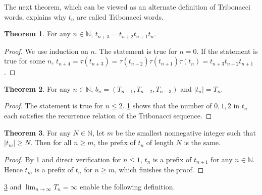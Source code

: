 \documentclass{article}
\theoremstyle{definition}
\newtheorem{theorem}{Theorem}
\begin{document}
The next theorem, which can be viewed as an alternate definition of Tribonacci words, explains why $t_n$ are called Tribonacci words.

\begin{theorem}
\label{thm 3}
For any $n\in \mathbb{N}$, $t_{n+3}=t_{n+2}t_{n+1}t_n$.
\end{theorem}
\begin{proof}
We use induction on $n$. The statement is true for $n=0$. If the statement is true for some $n$, $t_{n+4}=\tau(t_{n+3})=\tau(t_{n+2})\tau(t_{n+1})\tau(t_{n})=t_{n+3}t_{n+2}t_{n+1}$.
\end{proof}

\begin{theorem}
\label{thm 3-1}
For any $n\in \mathbb{N}$, $b_n=( T_{n-1}, T_{n-2}, T_{n-3})$ and $|t_n|=T_n$.
\end{theorem}
\begin{proof}
The statement is true for $n\leq2$. \cref{thm 3} shows that the number of $0, 1, 2$ in $t_n$ each satisfies the recurrence relation of the Tribonacci sequence.
\end{proof}

\begin{theorem}
\label{thm 3-2}
For any $N\in \mathbb{N}$, let $m$ be the smallest nonnegative integer such that $|t_m|\geq N$. Then for all $n\geq m$, the prefix of $t_n$ of length $N$ is the same.
\end{theorem}
\begin{proof}
By \cref{thm 3} and direct verification for $n\leq1$, $t_n$ is a prefix of $t_{n+1}$ for any $n\in \mathbb{N}$. Hence $t_m$ is a prefix of $t_n$ for $n\geq m$, which finishes the proof.
\end{proof}

\cref{thm 3-2} and $\lim_{n\rightarrow\infty}T_n=\infty$ enable the following definition.
\end{document}
